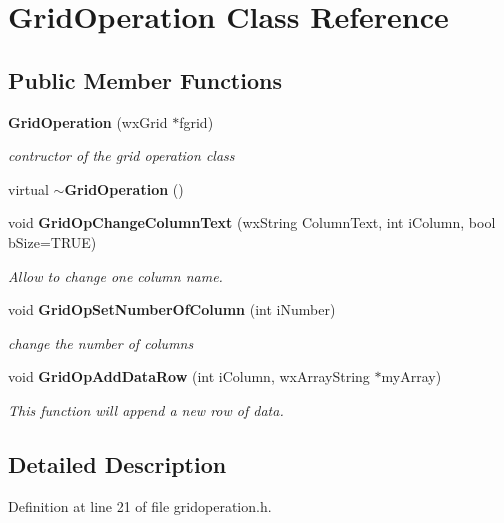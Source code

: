 \section{Grid\-Operation Class Reference}
\label{class_grid_operation}
\subsection*{Public Member Functions}
\begin{CompactItemize}
\item 
{\bf Grid\-Operation} (wx\-Grid $\ast$fgrid)
\begin{CompactList}\small\item\em contructor of the grid operation class \item\end{CompactList}\item 
virtual {\bf $\sim$Grid\-Operation} ()\label{class_grid_operation_622c8c83a53a6f5cd4ca247098f7d8a5}

\item 
void {\bf Grid\-Op\-Change\-Column\-Text} (wx\-String Column\-Text, int i\-Column, bool b\-Size=TRUE)
\begin{CompactList}\small\item\em Allow to change one column name. \item\end{CompactList}\item 
void {\bf Grid\-Op\-Set\-Number\-Of\-Column} (int i\-Number)
\begin{CompactList}\small\item\em change the number of columns \item\end{CompactList}\item 
void {\bf Grid\-Op\-Add\-Data\-Row} (int i\-Column, wx\-Array\-String $\ast$my\-Array)
\begin{CompactList}\small\item\em This function will append a new row of data. \item\end{CompactList}\end{CompactItemize}


\subsection{Detailed Description}




Definition at line 21 of file gridoperation.h.

